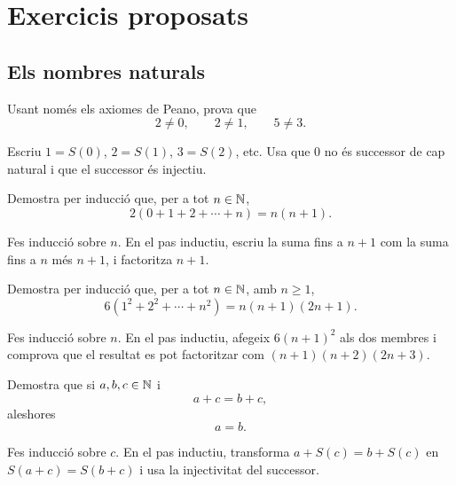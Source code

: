 

\chapter{Exercicis proposats}
\label{cap:exercicis-proposats}

\section{Els nombres naturals}

\begin{exercici}
Usant només els axiomes de Peano, prova que
\[
2\neq 0,\qquad 2\neq 1,\qquad 5\neq 3.
\]
\end{exercici}

\begin{indicacio}
Escriu \(1=S(0)\), \(2=S(1)\), \(3=S(2)\), etc. Usa que \(0\) no és successor de cap natural i que el successor és injectiu.
\end{indicacio}


\begin{exercici}
Demostra per inducció que, per a tot \(n\in\mathbb{N}\),
\[
2(0+1+2+\cdots+n)=n(n+1).
\]
\end{exercici}

\begin{indicacio}
Fes inducció sobre \(n\). En el pas inductiu, escriu la suma fins a \(n+1\) com la suma fins a \(n\) més \(n+1\), i factoritza \(n+1\).
\end{indicacio}


\begin{exercici}
Demostra per inducció que, per a tot \(n\in\mathbb{N}\), amb \(n\geq 1\),
\[
6(1^2+2^2+\cdots+n^2)=n(n+1)(2n+1).
\]
\end{exercici}

\begin{indicacio}
Fes inducció sobre \(n\). En el pas inductiu, afegeix \(6(n+1)^2\) als dos membres i comprova que el resultat es pot factoritzar com \((n+1)(n+2)(2n+3)\).
\end{indicacio}


\begin{exercici}
Demostra que si \(a,b,c\in\mathbb{N}\) i
\[
a+c=b+c,
\]
aleshores
\[
a=b.
\]
\end{exercici}

\begin{indicacio}
Fes inducció sobre \(c\). En el pas inductiu, transforma \(a+S(c)=b+S(c)\) en \(S(a+c)=S(b+c)\) i usa la injectivitat del successor.
\end{indicacio}


